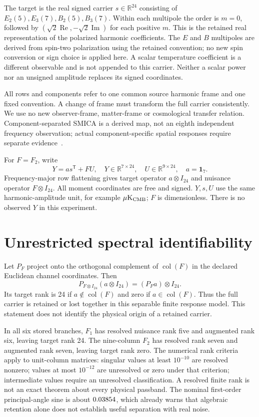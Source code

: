 \documentclass[aps,prd,onecolumn,11pt,nofootinbib,notitlepage]{revtex4-2}
\newcommand{\R}{\mathbb R}
\newcommand{\col}{\operatorname{col}}
\begin{document}
The target is the real signed carrier $s\in\R^{24}$ consisting of $E_2(5),E_3(7),B_2(5),B_3(7)$. Within each multipole the order is $m=0$, followed by $(\sqrt2\operatorname{Re},-\sqrt2\operatorname{Im})$ for each positive $m$. This is the retained real representation of the polarized harmonic coefficients. The $E$ and $B$ multipoles are derived from spin-two polarization using the retained convention; no new spin conversion or sign choice is applied here. A scalar temperature coefficient is a different observable and is not appended to this carrier. Neither a scalar power nor an unsigned amplitude replaces its signed coordinates.

All rows and components refer to one common source harmonic frame and one fixed convention. A change of frame must transform the full carrier consistently. We use no new observer-frame, matter-frame or cosmological transfer relation. Component-separated SMICA is a derived map, not an eighth independent frequency observation; actual component-specific spatial responses require separate evidence~\cite{Planck2018IV}.

For $F=F_2$, write
\begin{equation}
 Y=a s^{\mathsf T}+FU,\quad
 Y\in\R^{7\times24},\quad U\in\R^{9\times24},\quad a=\bm1_7.
 \label{eq:model}
\end{equation}
Frequency-major row flattening gives target operator $a\otimes I_{24}$ and nuisance operator $F\otimes I_{24}$. All moment coordinates are free and signed. $Y,s,U$ use the same harmonic-amplitude unit, for example $\mu\mathrm K_{\rm CMB}$; $F$ is dimensionless. There is no observed $Y$ in this experiment.

\section{Unrestricted spectral identifiability}

Let $P_F$ project onto the orthogonal complement of $\col(F)$ in the declared Euclidean channel coordinates. Then
\begin{equation}
 P_{F\otimes I_{24}}(a\otimes I_{24})=(P_Fa)\otimes I_{24}.
 \label{eq:quotient}
\end{equation}
Its target rank is 24 if $a\notin\col(F)$ and zero if $a\in\col(F)$. Thus the full carrier is retained or lost together in this separable finite response model. This statement does not identify the physical origin of a retained carrier.

In all six stored branches, $F_1$ has resolved nuisance rank five and augmented rank six, leaving target rank 24. The nine-column $F_2$ has resolved rank seven and augmented rank seven, leaving target rank zero. The numerical rank criteria apply to unit-column matrices: singular values at least $10^{-10}$ are resolved nonzero; values at most $10^{-12}$ are unresolved or zero under that criterion; intermediate values require an unresolved classification. A resolved finite rank is not an exact theorem about every physical passband. The nominal first-order principal-angle sine is about $0.03854$, which already warns that algebraic retention alone does not establish useful separation with real noise.
\end{document}
